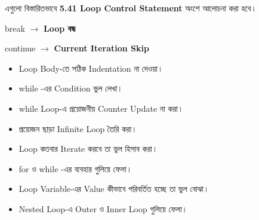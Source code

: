 \begin{rememberbox}

এগুলো বিস্তারিতভাবে
\textbf{5.41 Loop Control Statement}
অংশে আলোচনা করা হবে।

\begin{center}

\textenglish{\ttfamily break}
\(\longrightarrow\)
\textbf{Loop বন্ধ}

\qquad

\textenglish{\ttfamily continue}
\(\longrightarrow\)
\textbf{Current Iteration Skip}

\end{center}

\end{rememberbox}



\begin{rememberbox}

\begin{itemize}

\item Loop Body-তে সঠিক Indentation না দেওয়া।

\item
\textenglish{\ttfamily while}
-এর Condition ভুল লেখা।

\item
\textenglish{\ttfamily while}
Loop-এ প্রয়োজনীয় Counter Update না করা।

\item প্রয়োজন ছাড়া Infinite Loop তৈরি করা।

\item Loop কতবার Iterate করবে তা ভুল হিসাব করা।

\item
\textenglish{\ttfamily for}
ও
\textenglish{\ttfamily while}
-এর ব্যবহার গুলিয়ে ফেলা।

\item Loop Variable-এর Value কীভাবে পরিবর্তিত হচ্ছে তা ভুল বোঝা।

\item Nested Loop-এ Outer ও Inner Loop গুলিয়ে ফেলা।

\end{itemize}

\end{rememberbox}


